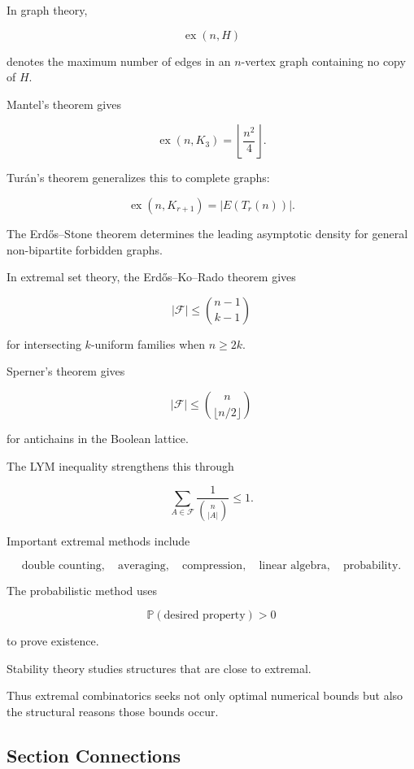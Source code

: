In graph theory,

\[
\boxed{
\operatorname{ex}(n,H)
}
\]

denotes the maximum number of edges in an \(n\)-vertex graph containing
no copy of \(H\).

Mantel's theorem gives

\[
\boxed{
\operatorname{ex}(n,K_3)
=
\left\lfloor\frac{n^2}{4}\right\rfloor.
}
\]

Tur\'an's theorem generalizes this to complete graphs:

\[
\boxed{
\operatorname{ex}(n,K_{r+1})
=
|E(T_r(n))|.
}
\]

The Erd\H{o}s--Stone theorem determines the leading asymptotic density
for general non-bipartite forbidden graphs.

In extremal set theory, the Erd\H{o}s--Ko--Rado theorem gives

\[
\boxed{
|\mathcal{F}|
\leq
\binom{n-1}{k-1}
}
\]

for intersecting \(k\)-uniform families when \(n\geq2k\).

Sperner's theorem gives

\[
\boxed{
|\mathcal{F}|
\leq
\binom{n}{\lfloor n/2\rfloor}
}
\]

for antichains in the Boolean lattice.

The LYM inequality strengthens this through

\[
\boxed{
\sum_{A\in\mathcal{F}}
\frac{1}{\binom{n}{|A|}}
\leq1.
}
\]

Important extremal methods include

\[
\boxed{
\text{double counting},
\quad
\text{averaging},
\quad
\text{compression},
\quad
\text{linear algebra},
\quad
\text{probability}.
}
\]

The probabilistic method uses

\[
\boxed{
\mathbb{P}(\text{desired property})>0
}
\]

to prove existence.

Stability theory studies structures that are close to extremal.

Thus extremal combinatorics seeks not only optimal numerical bounds but
also the structural reasons those bounds occur.

\subsection{Section Connections}
\label{subsec:extremal-combinatorics-connections}

